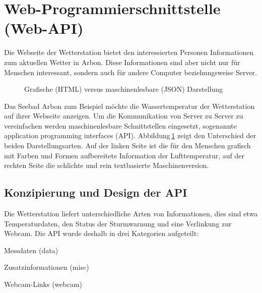\section{ Web-Programmierschnittstelle (Web-API)}
Die Webseite der Wetterstation bietet den interessierten Personen Informationen zum aktuellen Wetter in Arbon. Diese Informationen sind aber nicht nur für Menschen interessant, sondern auch für andere Computer beziehungsweise Server.

\begin{figure}[h!]
	\centering
	\caption{Grafische (HTML) versus maschinenlesbare (JSON) Darstellung}
	\label{img:humanvsmachine}
\end{figure}


\noindent
Das Seebad Arbon zum Beispiel möchte die Wassertemperatur der Wetterstation auf ihrer Webseite anzeigen. Um die Kommunikation von Server zu Server zu vereinfachen werden maschinenlesbare Schnittstellen eingesetzt, sogenannte application programming interfaces (API). Abbildung\,\ref{img:humanvsmachine} zeigt den Unterschied der beiden Darstellungsarten. Auf der linken Seite ist die für den Menschen grafisch mit Farben und Formen aufbereitete Information der Lufttemperatur, auf der rechten Seite die schlichte und rein textbasierte Maschinenversion.



\subsection{Konzipierung und Design der API}
Die Wetterstation liefert unterschiedliche Arten von Informationen, dies sind etwa Temperaturdaten, den Status der Sturmwarnung und eine Verlinkung zur Webcam. Die API wurde deshalb in drei Kategorien aufgeteilt:

\begin{itemize*}
\item Messdaten (data)
\item Zusatzinformationen (misc)
\item Webcam-Links (webcam)
\end{itemize*}

